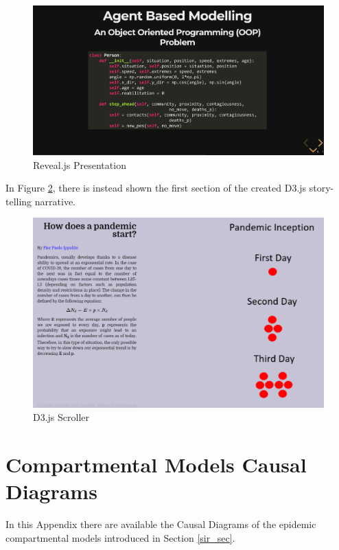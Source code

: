 \begin{appendices}
\begin{figure}[ht!]%
    \centering
    \includegraphics[width=1\linewidth]{latex/images/demo1.pdf}
    \caption{Reveal.js Presentation}
    \label{revealjs_ex}
\end{figure}
\vspace{-0.3cm}
In Figure \ref{d3js_ex}, there is instead shown the first section of the created D3.js story-telling narrative.

\begin{figure}[ht!]%
    \centering
    \includegraphics[width=0.8\linewidth]{latex/images/d3js_demo.pdf}
    \caption{D3.js Scroller}
    \label{d3js_ex}
\end{figure}

\newpage
\section{Compartmental Models Causal Diagrams}
\label{causal_comp}

In this Appendix there are available the Causal Diagrams of the epidemic compartmental models introduced in Section \ref{sir_sec}.


\end{appendices}
